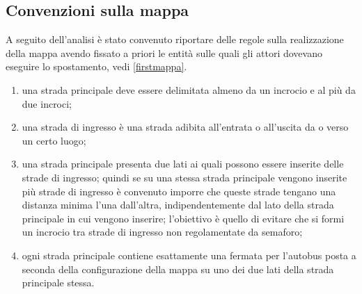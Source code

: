 \subsection{Convenzioni sulla mappa}
A seguito dell'analisi è stato convenuto riportare delle regole sulla realizzazione della mappa avendo fissato a priori le entità sulle quali gli attori dovevano eseguire lo spostamento, vedi \ref{firstmappa}.
\begin{enumerate}
\item una strada principale deve essere delimitata almeno da un incrocio e al più da due incroci;
\item una strada di ingresso è una strada adibita all'entrata o all'uscita da o verso un certo luogo;
\item una strada principale presenta due lati ai quali possono essere inserite delle strade di ingresso; quindi se su una stessa strada principale vengono inserite più strade di ingresso è convenuto imporre che queste strade tengano una distanza minima l'una dall'altra, indipendentemente dal lato della strada principale in cui vengono inserire; l'obiettivo è quello di evitare che si formi un incrocio tra strade di ingresso non regolamentate da semaforo;
\item ogni strada principale contiene esattamente una fermata per l'autobus posta a seconda della configurazione della mappa su uno dei due lati della strada principale stessa.
\end{enumerate}

